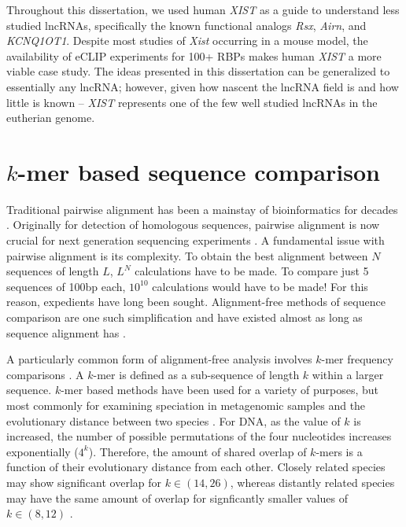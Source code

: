 Throughout this dissertation, we used human \textit{XIST} as a guide to understand less studied lncRNAs, specifically the known functional analogs \emph{Rsx}, \emph{Airn}, and \emph{KCNQ1OT1}. Despite most studies of \textit{Xist} occurring in a mouse model, the availability of eCLIP experiments for 100+ RBPs makes human \textit{XIST} a more viable case study.  The ideas presented in this dissertation can be generalized to essentially any lncRNA; however, given how nascent the lncRNA field is and how little is known -- \emph{XIST} represents one of the few well studied lncRNAs in the eutherian genome.

\section{$k$-mer based sequence comparison}
Traditional pairwise alignment has been a mainstay of bioinformatics for decades \cite{Smith1981IdentificationSubsequences}. Originally for detection of homologous sequences, pairwise alignment is now crucial for next generation sequencing experiments \cite{Dobin2013STAR:Aligner,Langmead2009UltrafastGenome}. A fundamental issue with pairwise alignment is its complexity. To obtain the best alignment between $N$ sequences of length $L$, $L^N$ calculations have to be made. To compare just 5 sequences of 100bp each, $10^{10}$ calculations would have to be made! For this reason, expedients have long been sought. Alignment-free methods of sequence comparison are one such simplification and have existed almost as long as sequence alignment has \cite{Haubold2014Alignment-freeGenetics,Vinga2003Alignment-freeReview}.

A particularly common form of alignment-free analysis involves $k$-mer frequency comparisons \cite{Haubold2014Alignment-freeGenetics}. A $k$-mer is defined as a sub-sequence of length $k$ within a larger sequence. $k$-mer based methods have been used for a variety of purposes, but most commonly for examining speciation in metagenomic samples and the evolutionary distance between two species \cite{Sims2011Whole-genomeFFPs,Yang2008PerformanceReconstruction,Yi2013Co-phylog:Organisms,Qi2004WholeApproach}. For DNA, as the value of $k$ is increased, the number of possible permutations of the four nucleotides increases exponentially ($4^k$). Therefore, the amount of shared overlap of $k$-mers is a function of their evolutionary distance from each other. Closely related species may show significant overlap for $k\in(14,26)$, whereas distantly related species may have the same amount of overlap for signficantly smaller values of $k\in(8,12)$ \cite{Qi2004WholeApproach,Yi2013Co-phylog:Organisms,Sims2011Whole-genomeFFPs}. 

